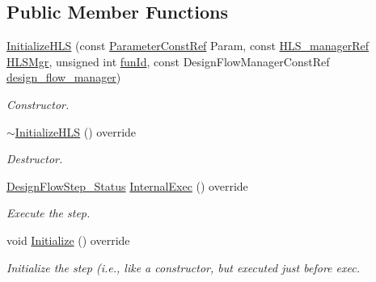 \subsection*{Public Member Functions}
\begin{DoxyCompactItemize}
\item 
\hyperlink{classInitializeHLS_acd3588fecbb6f0b78e6d21be966d856d}{Initialize\+H\+LS} (const \hyperlink{Parameter_8hpp_a37841774a6fcb479b597fdf8955eb4ea}{Parameter\+Const\+Ref} Param, const \hyperlink{hls__manager_8hpp_acd3842b8589fe52c08fc0b2fcc813bfe}{H\+L\+S\+\_\+manager\+Ref} \hyperlink{classHLS__step_ade85003a99d34134418451ddc46a18e9}{H\+L\+S\+Mgr}, unsigned int \hyperlink{classHLSFunctionStep_a3e6434fd86c698b0c70520b859bff5b0}{fun\+Id}, const Design\+Flow\+Manager\+Const\+Ref \hyperlink{classDesignFlowStep_ab770677ddf087613add30024e16a5554}{design\+\_\+flow\+\_\+manager})
\begin{DoxyCompactList}\small\item\em Constructor. \end{DoxyCompactList}\item 
\hyperlink{classInitializeHLS_aa77f47b5204b0a974ef83ab5bec545f8}{$\sim$\+Initialize\+H\+LS} () override
\begin{DoxyCompactList}\small\item\em Destructor. \end{DoxyCompactList}\item 
\hyperlink{design__flow__step_8hpp_afb1f0d73069c26076b8d31dbc8ebecdf}{Design\+Flow\+Step\+\_\+\+Status} \hyperlink{classInitializeHLS_abb4fa19e0a7910383cb1837ee6e6a1e5}{Internal\+Exec} () override
\begin{DoxyCompactList}\small\item\em Execute the step. \end{DoxyCompactList}\item 
void \hyperlink{classInitializeHLS_ae1674f8063ae4a38affcf5d2ca3ede18}{Initialize} () override
\begin{DoxyCompactList}\small\item\em Initialize the step (i.\+e., like a constructor, but executed just before exec. \end{DoxyCompactList}\end{DoxyCompactItemize}
